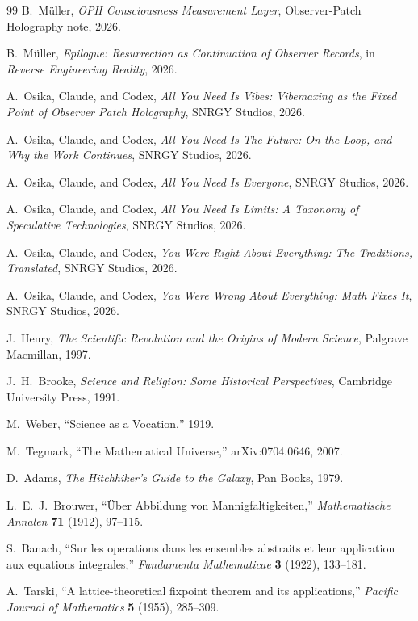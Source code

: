 \documentclass[11pt]{article}
\theoremstyle{remark}
\theoremstyle{plain}
\begin{document}
\begin{thebibliography}{99}
B.\ M\"uller,
\emph{OPH Consciousness Measurement Layer},
Observer-Patch Holography note, 2026.

B.\ M\"uller,
\emph{Epilogue: Resurrection as Continuation of Observer Records},
in \emph{Reverse Engineering Reality}, 2026.

A.\ Osika, Claude, and Codex,
\emph{All You Need Is Vibes: Vibemaxing as the Fixed Point of Observer Patch Holography},
SNRGY Studios, 2026.

A.\ Osika, Claude, and Codex,
\emph{All You Need Is The Future: On the Loop, and Why the Work Continues},
SNRGY Studios, 2026.

A.\ Osika, Claude, and Codex,
\emph{All You Need Is Everyone},
SNRGY Studios, 2026.

A.\ Osika, Claude, and Codex,
\emph{All You Need Is Limits: A Taxonomy of Speculative Technologies},
SNRGY Studios, 2026.

A.\ Osika, Claude, and Codex,
\emph{You Were Right About Everything: The Traditions, Translated},
SNRGY Studios, 2026.

A.\ Osika, Claude, and Codex,
\emph{You Were Wrong About Everything: Math Fixes It},
SNRGY Studios, 2026.

J.\ Henry,
\emph{The Scientific Revolution and the Origins of Modern Science},
Palgrave Macmillan, 1997.

J.\ H.\ Brooke,
\emph{Science and Religion: Some Historical Perspectives},
Cambridge University Press, 1991.

M.\ Weber,
``Science as a Vocation,''
1919.

M.\ Tegmark,
``The Mathematical Universe,''
arXiv:0704.0646, 2007.

D.\ Adams,
\emph{The Hitchhiker's Guide to the Galaxy},
Pan Books, 1979.

L.\ E.\ J.\ Brouwer,
``\"Uber Abbildung von Mannigfaltigkeiten,''
\emph{Mathematische Annalen} \textbf{71} (1912), 97--115.

S.\ Banach,
``Sur les operations dans les ensembles abstraits et leur application aux equations integrales,''
\emph{Fundamenta Mathematicae} \textbf{3} (1922), 133--181.

A.\ Tarski,
``A lattice-theoretical fixpoint theorem and its applications,''
\emph{Pacific Journal of Mathematics} \textbf{5} (1955), 285--309.


\end{thebibliography}
\end{document}
